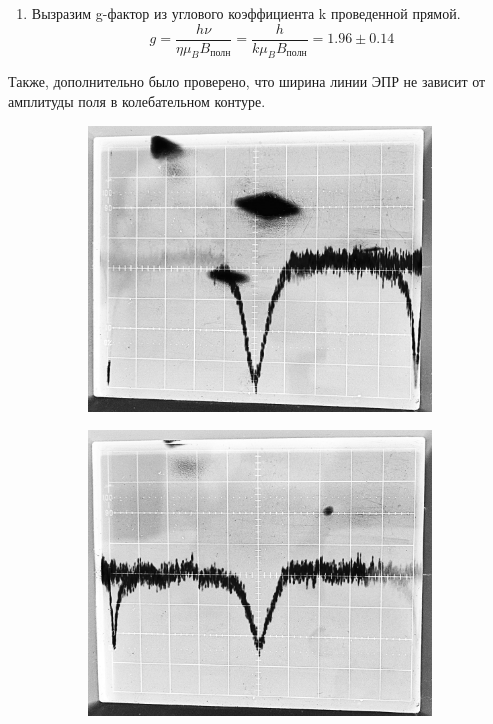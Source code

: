 \documentclass[14pt, a4paper]{report}
\begin{document}
\begin{enumerate}
\item Вызразим g-фактор из углового коэффициента k проведенной прямой.
\[g=\frac{h\nu}{\eta\mu_B B_{полн}}=\frac{h}{k\mu_B B_{полн}}=1.96\pm0.14\]

\end{enumerate}

Также, дополнительно было проверено, что ширина линии ЭПР не зависит от амплитуды поля в колебательном контуре.

\begin{figure}[H]
\centering
\begin{subfigure}{.33\textwidth}
  \centering
  \includegraphics[width=.95\linewidth]{../images/5101-9a}
\end{subfigure}%
\begin{subfigure}{.33\textwidth}
  \centering
  \includegraphics[width=.95\linewidth]{../images/5101-9b}

\end{subfigure}
\end{figure}
\end{document}
